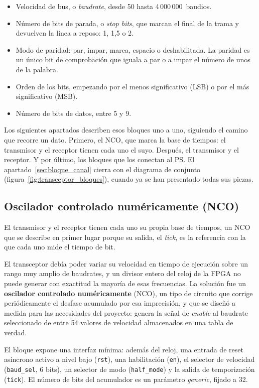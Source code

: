 \begin{itemize}
    \item Velocidad de bus, o \textit{baudrate}, desde 50 hasta 4\,000\,000~baudios.
    \item Número de bits de parada, o \textit{stop bits}, que marcan el final de la trama y
    devuelven la línea a reposo: 1, 1,5 o 2.
    \item Modo de paridad: par, impar, marca, espacio o deshabilitada. La paridad es un único bit
    de comprobación que iguala a par o a impar el número de unos de la palabra.
    \item Orden de los bits, empezando por el menos significativo (LSB) o por el más
    significativo (MSB).
    \item Número de bits de datos, entre 5 y 9.
\end{itemize}

Los siguientes apartados describen esos bloques uno a uno, siguiendo el camino que recorre un
dato. Primero, el NCO, que marca la base de tiempos: el transmisor y el receptor tienen cada
uno el suyo. Después, el transmisor y el receptor. Y por último, los bloques que los conectan
al PS. El
apartado~\ref{sec:bloque_canal} cierra con el diagrama de conjunto
(figura~\ref{fig:transceptor_bloques}), cuando ya se han presentado todas sus piezas.

\subsection{Oscilador controlado numéricamente (NCO)}

El transmisor y el receptor tienen cada uno su propia base de tiempos, un NCO que se describe
en primer lugar porque su salida, el \textit{tick}, es la referencia con la que cada uno mide el
tiempo de bit.

El transceptor debía poder variar su velocidad en tiempo de ejecución sobre un rango muy amplio
de baudrates, y un divisor entero del reloj de la FPGA no puede generar con exactitud la mayoría
de esas frecuencias. La solución fue un \textbf{oscilador controlado numéricamente} (NCO), un tipo
de circuito que corrige periódicamente el desfase acumulado por esa imprecisión, y que se diseñó
a medida para las necesidades del proyecto: genera la señal de \textit{enable} al baudrate
seleccionado de entre 54 valores de velocidad almacenados en una tabla de verdad.

El bloque expone una interfaz mínima: además del reloj, una entrada de reset asíncrono activo a
nivel bajo (\texttt{rst}), una habilitación (\texttt{en}), el selector de velocidad
(\texttt{baud\_sel}, 6 bits), un selector de modo (\texttt{half\_mode}) y la salida de
temporización (\texttt{tick}). El número de bits del acumulador es un parámetro \textit{generic},
fijado a 32.

